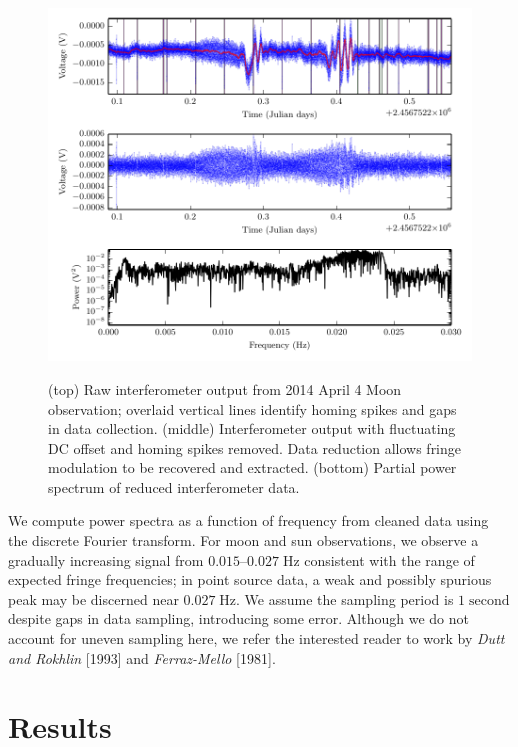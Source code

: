 \documentclass[10pt]{article}
\newcommand {\mt}{\mathrm}
\newcommand {\unit}[1]{\; \mt{#1}}
\begin{document}
\begin{figure}[!ht]
    \centering
    \includegraphics{plots/moon_cleaning.pdf} \\
    \caption{(top) Raw interferometer output from 2014 April 4 Moon observation; overlaid vertical lines identify homing spikes and gaps in data collection. (middle) Interferometer output with fluctuating DC offset and homing spikes removed.  Data reduction allows fringe modulation to be recovered and extracted.  (bottom) Partial power spectrum of reduced interferometer data.}
    \label{fig:reduction}
\end{figure}

We compute power spectra as a function of frequency from cleaned data using the discrete Fourier transform.  For moon and sun observations, we observe a gradually increasing signal from $0.015$--$0.027 \unit{Hz}$ consistent with the range of expected fringe frequencies; in point source data, a weak and possibly spurious peak may be discerned near $0.027 \unit{Hz}$.  We assume the sampling period is $1 \unit{second}$ despite gaps in data sampling, introducing some error.  Although we do not account for uneven sampling here, we refer the interested reader to work by \textit{Dutt and Rokhlin} [1993] and \textit{Ferraz-Mello} [1981].

\section{Results}
\end{document}
